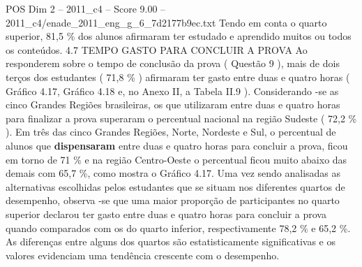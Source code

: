 \begin{textsample}{POS Dim 2 – 2011\_c4 – Score 9.00 – 2011\_c4/enade\_2011\_eng\_g\_6\_7d2177b9ec.txt}
Tendo em conta o quarto superior, 81,5 \% dos alunos afirmaram ter estudado e aprendido muitos ou todos os conteúdos. 4.7 TEMPO GASTO PARA CONCLUIR A PROVA Ao responderem sobre o tempo de conclusão da prova ( Questão 9 ), mais de dois terços dos estudantes ( 71,8 \% ) afirmaram ter gasto entre duas e quatro horas ( Gráfico 4.17, Gráfico 4.18 e, no Anexo II, a Tabela II.9 ).
Considerando -se as cinco Grandes Regiões brasileiras, os que utilizaram entre duas e quatro horas para finalizar a prova superaram o percentual nacional na região Sudeste ( 72,2 \% ).
Em três das cinco Grandes Regiões, Norte, Nordeste e Sul, o percentual de alunos que \textbf{dispensaram} entre duas e quatro horas para concluir a prova, ficou em torno de 71 \% e na região Centro-Oeste o percentual ficou muito abaixo das demais com 65,7 \%, como mostra o Gráfico 4.17.
Uma vez sendo analisadas as alternativas escolhidas pelos estudantes que se situam nos diferentes quartos de desempenho, observa -se que uma maior proporção de participantes no quarto superior declarou ter gasto entre duas e quatro horas para concluir a prova quando comparados com os do quarto inferior, respectivamente 78,2 \% e 65,2 \%.
As diferenças entre alguns dos quartos são estatisticamente significativas e os valores evidenciam uma tendência crescente com o desempenho.

\end{textsample}
